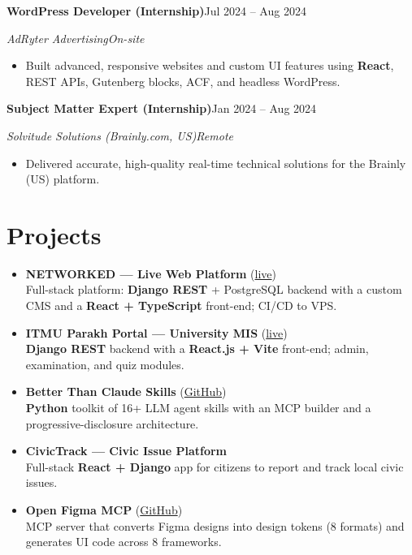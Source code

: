 \documentclass[a4paper,10pt]{article}
\newcommand{\entry}[4]{%
  \vspace{3pt}%
  \textbf{#1}\hfill #2\par
  \vspace{1pt}%
  \textit{#3}\hfill \textit{#4}\par
  \vspace{2pt}%
}
\begin{document}
\entry{WordPress Developer (Internship)}{Jul 2024 -- Aug 2024}{AdRyter Advertising}{On-site}
\begin{itemize}
  \item Built advanced, responsive websites and custom UI features using \textbf{React}, REST APIs,
        Gutenberg blocks, ACF, and headless WordPress.
\end{itemize}

\entry{Subject Matter Expert (Internship)}{Jan 2024 -- Aug 2024}{Solvitude Solutions (Brainly.com, US)}{Remote}
\begin{itemize}
  \item Delivered accurate, high-quality real-time technical solutions for the Brainly (US) platform.
\end{itemize}

\section{Projects}
\begin{itemize}
  \item \textbf{NETWORKED --- Live Web Platform} (\href{https://networkedconsultancy.com}{live})\\
        Full-stack platform: \textbf{Django REST} + PostgreSQL backend with a custom CMS and a \textbf{React + TypeScript} front-end; CI/CD to VPS.
  \item \textbf{ITMU Parakh Portal --- University MIS} (\href{https://parakh.itmuniversity.ac.in}{live})\\
        \textbf{Django REST} backend with a \textbf{React.js + Vite} front-end; admin, examination, and quiz modules.
  \item \textbf{Better Than Claude Skills} (\href{https://github.com/Shivam990q/better-than-claude-skills}{GitHub})\\
        \textbf{Python} toolkit of 16+ LLM agent skills with an MCP builder and a progressive-disclosure architecture.
  \item \textbf{CivicTrack --- Civic Issue Platform}\\
        Full-stack \textbf{React + Django} app for citizens to report and track local civic issues.
  \item \textbf{Open Figma MCP} (\href{https://github.com/Shivam990q/open-figma-mcp}{GitHub})\\
        MCP server that converts Figma designs into design tokens (8 formats) and generates UI code across 8 frameworks.
\end{itemize}
\end{document}
